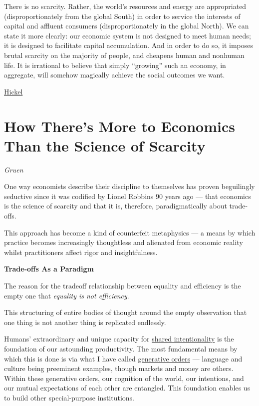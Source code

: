 \documentclass[
]{book}
\begin{document}
There is no scarcity. Rather, the world's resources and energy are appropriated (disproportionately from the global South) in order to service the interests of capital and affluent consumers (disproportionately in the global North). We can state it more clearly: our economic system is not designed to meet human needs; it is designed to facilitate capital accumulation. And in order to do so, it imposes brutal scarcity on the majority of people, and cheapens human and nonhuman life. It is irrational to believe that simply ``growing'' such an economy, in aggregate, will somehow magically achieve the social outcomes we want.

\href{https://www.jasonhickel.org/blog/2021/2/21/is-the-world-poor-or-unjust}{Hickel}

\hypertarget{how-theres-more-to-economics-than-the-science-of-scarcity}{%
\section{How There's More to Economics Than the Science of Scarcity}\label{how-theres-more-to-economics-than-the-science-of-scarcity}}

\emph{Gruen}

One way economists describe their discipline to themselves has proven beguilingly seductive since it was codified by Lionel Robbins 90 years ago --- that economics is the science of scarcity and that it is, therefore, paradigmatically about trade-offs.

This approach has become a kind of counterfeit metaphysics --- a means by which practice becomes increasingly thoughtless and alienated from economic reality whilst practitioners affect rigor and insightfulness.

\textbf{Trade-offs As a Paradigm}

The reason for the tradeoff relationship between equality and efficiency is the empty one that \emph{equality is not efficiency}.

This structuring of entire bodies of thought around the empty observation that one thing is not another thing is replicated endlessly.

Humans' extraordinary and unique capacity for \href{https://clubtroppo.com.au/2020/05/30/culture-and-language-as-public-goods/\#:~:text=Shared\%20intentionality\%3A\%20the\%20ultimate\%20form\%20of\%20sharing}{shared intentionality} is the foundation of our astounding productivity. The most fundamental means by which this is done is via what I have called \href{http://clubtroppo.com.au/2020/03/21/hierarchy-and-generative-orders-some-introductory-thoughts/}{generative orders} --- language and culture being preeminent examples, though markets and money are others. Within these generative orders, our cognition of the world, our intentions, and our mutual expectations of each other are entangled. This foundation enables us to build other special-purpose institutions.
\end{document}
